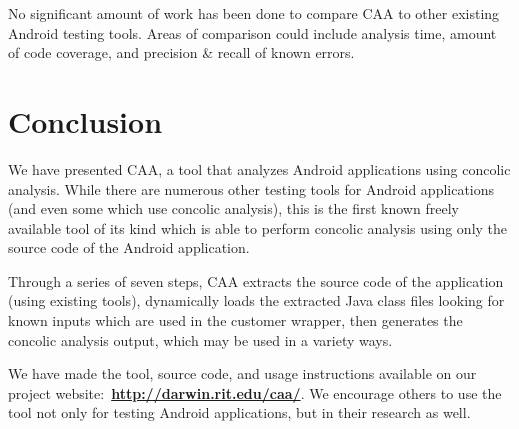 \documentclass{sig-alternate}
\begin{document}
No significant amount of work has been done to compare CAA to other existing Android testing tools. Areas of comparison could include analysis time, amount of code coverage, and precision \& recall of known errors.

\section{Conclusion}
\label{sec: conclusion}

We have presented CAA, a tool that analyzes Android applications using concolic analysis. While there are numerous other testing tools for Android applications (and even some which use concolic analysis), this is the first known freely available tool of its kind which is able to perform concolic analysis using only the source code of the Android application.

Through a series of seven steps, CAA extracts the source code of the application (using existing tools), dynamically loads the extracted Java class files looking for known inputs which are used in the customer wrapper, then generates the concolic analysis output, which may be used in a variety ways.

We have made the tool, source code, and usage instructions available on our project website:~\textbf{\url{http://darwin.rit.edu/caa/}}. We encourage others to use the tool not only for testing Android applications, but in their research as well.


\balance



\end{document}
